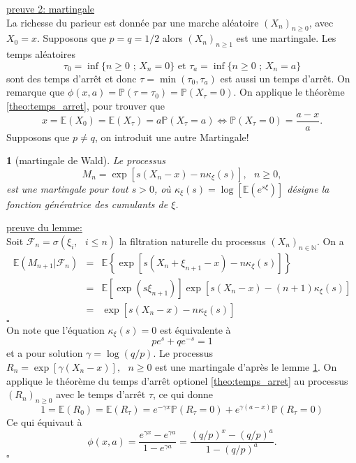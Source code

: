 \documentclass[8pt,notheorems]{beamer}
\def \E{\mathbb E}
\def \N{\mathbb N}
\def \P {\mathbb P}
\newtheorem{lemma}{\translate{Lemme}}
\theoremstyle{definition}
\theoremstyle{example}
\theoremstyle{mystyle}
\theoremstyle{plain}
\begin{document}
\begin{frame}[allowframebreaks]
\underline{preuve 2: martingale}\\
La richesse du parieur est donnée par une marche aléatoire $(X_n)_{n\geq0}$, avec $X_0 = x$. Supposons que $p = q = 1/2$ alors $(X_n)_{n\geq1}$ est une martingale. Les temps aléatoires 
$$
\tau_0 = \inf\{n\geq0\text{ ; }X_n = 0\}\text{ et }\tau_a = \inf\{n\geq0\text{ ; }X_n = a\}
$$
sont des temps d'arrêt et donc $\tau = \min(\tau_0,\tau_a)$ est aussi un temps d'arrêt. On remarque que $\phi(x,a) = \P(\tau = \tau_0) = \P(X_\tau = 0)$. On applique le théorème \ref{theo:temps_arret}, pour trouver que 
$$
x= \E(X_0) = \E(X_\tau) = a \P(X_\tau = a)\Leftrightarrow \P(X_\tau = 0) = \frac{a-x}{a}.
$$
Supposons que $p\neq q$, on introduit une autre Martingale!
\begin{lemma}[martingale de Wald]\label{lem:wald}
Le processus 
$$
M_n = \exp\left[s(X_n - x) - n\kappa_\xi(s)\right],\text{ }n \geq 0,
$$
est une martingale pour tout $s>0$, où $\kappa_{\xi}(s)=\log\left[\E\left(e^{s\xi}\right)\right]$ désigne la fonction génératrice des cumulants de $\xi$.
\end{lemma}
\underline{preuve du lemme:}\\
Soit $\mathcal{F}_n = \sigma(\xi_i,\text{ }i\leq n)$ la filtration naturelle du processus $(X_n)_{n\in\N}$. On a 
\begin{eqnarray*}
\E(M_{n+1}|\mathcal{F}_n) &=& \E\left\{\exp\left[s(X_n + \xi_{n+1} - x) - n\kappa_\xi(s)\right]\right\}\\
  &=&\E\left[\exp\left(s\xi_{n+1}\right)\right]\exp\left[s(X_n - x) - (n+1)\kappa_\xi(s)\right]\\
  &=&\exp\left[s(X_n - x) - n\kappa_\xi(s)\right]
\end{eqnarray*}
$\square$\\
On note que l'équation $\kappa_\xi(s) = 0$ est équivalente à 
$$
pe^s+qe^{-s}=1
$$ 
et a pour solution $\gamma = \log(q/p)$. Le processus $R_n =\exp\left[\gamma(X_n - x)\right],\text{ }n\geq0$ est une martingale d'après le lemme \ref{lem:wald}. On applique le théorème du temps d'arrêt optionel \ref{theo:temps_arret} au processus $(R_n)_{n\geq0}$ avec le temps d'arrêt $\tau$, ce qui donne 
$$
1 = \E(R_0) =\E(R_\tau) = e^{-\gamma x}\P(R_\tau = 0)+ e^{\gamma(a-x)}\P(R_\tau = 0)
$$
Ce qui équivaut à 
$$
\phi(x,a) = \frac{e^{\gamma x}-e^{\gamma a}}{1-e^{\gamma a}} =\frac{(q/p)^x-(q/p)^{a}}{1-(q/p)^{a}}.  
$$
$\square$
\end{frame}
\end{document}
